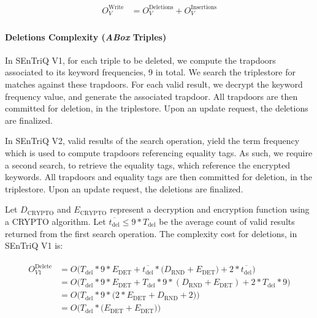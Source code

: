 \begin{align}
    \label{equation:update-write-componenet}
    \begin{split}
        O^{\text{Write}}_V
        &= O^{\text{Deletions}}_V + O^{\text{Insertions}}_V
    \end{split}
\end{align}

\paragraph{Deletions Complexity (\emph{ABox} Triples)}

In \gls{SEnTriQ} V1, for each triple to be deleted, we compute the trapdoors associated to its keyword frequencies, 9 in total. We search the triplestore for matches against these trapdoors. For each valid result, we decrypt the keyword frequency value, and generate the associated trapdoor. All trapdoors are then committed for deletion, in the triplestore. Upon an update request, the deletions are finalized.

In \gls{SEnTriQ} V2, valid results of the search operation, yield the term frequency which is used to compute trapdoors referencing equality tags. As such, we require a second search, to retrieve the equality tags, which reference the encrypted keywords. All trapdoors and equality tags are then committed for deletion, in the triplestore. Upon an update request, the deletions are finalized.

Let $D_{\text{CRYPTO}}$ and $E_{\text{CRYPTO}}$ represent a decryption and encryption function using a CRYPTO algorithm. Let $\overline{t_{\text{del}}} \leq 9 * T_{\text{del}}$ be the average count of valid results returned from the first search operation. The complexity cost for deletions, in \gls{SEnTriQ} V1 is:


\begin{align}
    \label{equation:update-delete-v1-complexity}
    \begin{split}
        O^{\text{Delete}}_{V1} &=
        O\Big(
            T_{\text{del}} * 9 * E_{\text{DET}}
            + \overline{t_{\text{del}}} * \big(D_{\text{RND}} +  E_{\text{DET}}\big)             
            + 2 * \overline{t_{\text{del}}}
        \Big) \\
        &= O\Big(
            T_{\text{del}} * 9 * E_{\text{DET}}
            + T_{\text{del}} * 9 * (D_{\text{RND}} +  E_{\text{DET}})             
            + 2 * T_{\text{del}} * 9
        \Big) \\
        &= O\Big(
            T_{\text{del}} * 9 * \big( 2 * E_{\text{DET}} + D_{\text{RND}} +  2 \big)\Big) \\
        &= O\Big(T_{\text{del}} * \big(E_{\text{DET}} + E_{\text{DET}}\big)\Big) \\
    \end{split}
\end{align}


